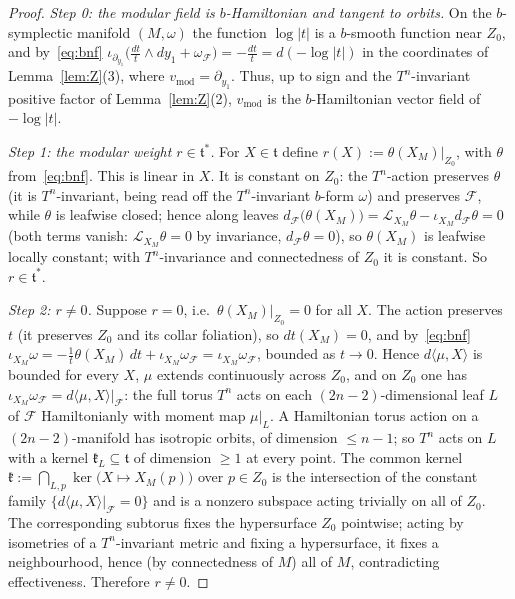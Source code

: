\documentclass{amsart}
\theoremstyle{definition}
\begin{document}
\begin{proof}
\emph{Step 0: the modular field is $b$-Hamiltonian and tangent to orbits.}
On the $b$-symplectic manifold $(M,\omega)$ the function $\log|t|$ is a
$b$-smooth function near $Z_0$, and by~\eqref{eq:bnf}
$\iota_{\partial_{y_1}}\bigl(\tfrac{dt}{t}\wedge dy_1+\omega_{\mathcal F}\bigr)
=-\tfrac{dt}{t}=d(-\log|t|)$ in the coordinates of Lemma~\ref{lem:Z}(3), where
$v_{\mathrm{mod}}=\partial_{y_1}$. Thus, up to sign and the $T^n$-invariant
positive factor of Lemma~\ref{lem:Z}(2), $v_{\mathrm{mod}}$ is the
$b$-Hamiltonian vector field of $-\log|t|$.

\emph{Step 1: the modular weight $r\in\mathfrak t^*$.} For $X\in\mathfrak t$
define $r(X):=\theta(X_M)\big|_{Z_0}$, with $\theta$ from~\eqref{eq:bnf}. This
is linear in $X$. It is constant on $Z_0$: the $T^n$-action preserves $\theta$
(it is $T^n$-invariant, being read off the $T^n$-invariant $b$-form $\omega$)
and preserves $\mathcal F$, while $\theta$ is leafwise closed; hence along leaves
$d_{\mathcal F}\bigl(\theta(X_M)\bigr)=\mathcal L_{X_M}\theta-\iota_{X_M}
d_{\mathcal F}\theta=0$ (both terms vanish: $\mathcal L_{X_M}\theta=0$ by
invariance, $d_{\mathcal F}\theta=0$), so $\theta(X_M)$ is leafwise locally
constant; with $T^n$-invariance and connectedness of $Z_0$ it is constant. So
$r\in\mathfrak t^*$.

\emph{Step 2: $r\neq0$.} Suppose $r=0$, i.e.\ $\theta(X_M)|_{Z_0}=0$ for all
$X$. The action preserves $t$ (it preserves $Z_0$ and its collar foliation), so
$dt(X_M)=0$, and by~\eqref{eq:bnf}
$\iota_{X_M}\omega=-\tfrac{1}{t}\theta(X_M)\,dt+\iota_{X_M}\omega_{\mathcal F}
=\iota_{X_M}\omega_{\mathcal F}$, bounded as $t\to0$. Hence
$d\langle\mu,X\rangle$ is bounded for every $X$, $\mu$ extends continuously
across $Z_0$, and on $Z_0$ one has $\iota_{X_M}\omega_{\mathcal F}=
d\langle\mu,X\rangle|_{\mathcal F}$: the full torus $T^n$ acts on each
$(2n-2)$-dimensional leaf $L$ of $\mathcal F$ Hamiltonianly with moment map
$\mu|_L$. A Hamiltonian torus action on a $(2n-2)$-manifold has isotropic
orbits, of dimension $\le n-1$; so $T^n$ acts on $L$ with a kernel
$\mathfrak k_L\subseteq\mathfrak t$ of dimension $\ge1$ at every point. The
common kernel $\mathfrak k:=\bigcap_{L,p}\ker\bigl(X\mapsto X_M(p)\bigr)$ over
$p\in Z_0$ is the intersection of the constant family $\{d\langle\mu,X\rangle
|_{\mathcal F}=0\}$ and is a nonzero subspace acting trivially on all of $Z_0$.
The corresponding subtorus fixes the hypersurface $Z_0$ pointwise; acting by
isometries of a $T^n$-invariant metric and fixing a hypersurface, it fixes a
neighbourhood, hence (by connectedness of $M$) all of $M$, contradicting
effectiveness. Therefore $r\neq0$.


\end{proof}
\end{document}

